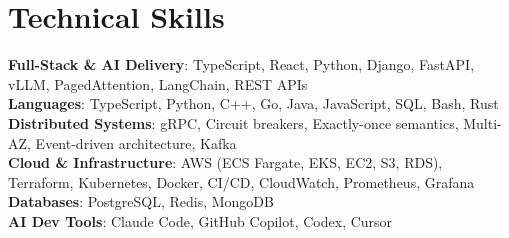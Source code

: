 \documentclass[letterpaper,11pt]{article}
\begin{document}
\section{Technical Skills}
\vspace{-7pt}
\begin{itemize}
[leftmargin=0.15in, label={}]\small{\item{
        \textbf{Full-Stack \& AI Delivery}{: TypeScript, React, Python, Django, FastAPI, vLLM, PagedAttention, LangChain, REST APIs} \\
        \textbf{Languages}{: TypeScript, Python, C++, Go, Java, JavaScript, SQL, Bash, Rust} \\
        \textbf{Distributed Systems}{: gRPC, Circuit breakers, Exactly-once semantics, Multi-AZ, Event-driven architecture, Kafka} \\
        \textbf{Cloud \& Infrastructure}{: AWS (ECS Fargate, EKS, EC2, S3, RDS), Terraform, Kubernetes, Docker, CI/CD, CloudWatch, Prometheus, Grafana} \\
        \textbf{Databases}{: PostgreSQL, Redis, MongoDB} \\
        \textbf{AI Dev Tools}{: Claude Code, GitHub Copilot, Codex, Cursor} \\
}}
\end{itemize}
\end{document}
